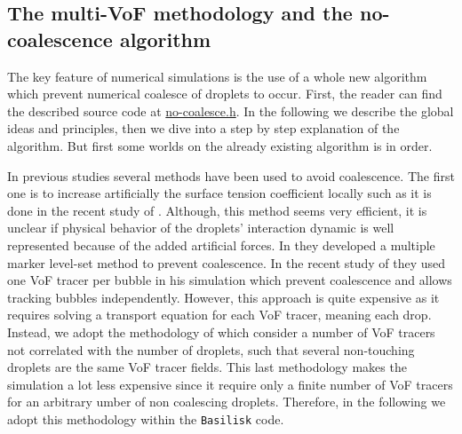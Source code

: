 \subsection{The multi-VoF methodology and the no-coalescence algorithm}


The key feature of numerical simulations is the use of a whole new algorithm which prevent numerical coalesce of droplets to occur.
First, the reader can find the described source code at \href{https://basilisk.fr/sandbox/fintzin/no-coalesce.h}{no-coalesce.h}. 
In the following we describe the global ideas and principles, then we dive into a step by step explanation of the algorithm. 
But first some worlds on the already existing algorithm is in order.

In previous studies several methods have been used to avoid coalescence. 
The first one is to increase artificially the surface tension coefficient locally such as it is done in the recent study of \citet{hidman2023assessing}.
Although, this method seems very efficient, it is unclear if physical behavior of the droplets' interaction dynamic is well represented because of the added artificial forces. 
In  \citet{balcazar2015multiple} they developed a multiple marker level-set method to prevent coalescence. 
In the recent study of \citet{zhang2021direct} they  used one VoF tracer per bubble in his simulation which prevent coalescence and allows tracking bubbles independently. 
However, this approach is quite expensive as it requires solving a transport equation for each VoF tracer, meaning each drop. 
Instead, we adopt the methodology of \citet{karnakov2022computing} which consider a number of VoF tracers not correlated with the number of droplets, such that several non-touching droplets are the same VoF tracer fields.
This last methodology makes the simulation a lot less expensive since it require only a finite number of VoF tracers for an arbitrary umber of non coalescing droplets.  
Therefore, in the following we adopt this methodology within the \texttt{Basilisk} code. 

